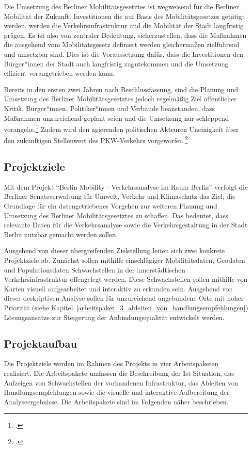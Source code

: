 Die Umsetzung des Berliner Mobilitätsgesetztes ist wegweisend für die Berliner Mobilität der Zukunft. Investitionen die auf Basis des Mobilitätsgesetzes getätigt werden, werden die Verkehrsinfrastruktur und die Mobilität der Stadt langfristig prägen. Es ist also von zentraler Bedeutung, sicherzustellen, dass die Maßnahmen die ausgehend vom Mobilitätsgesetz definiert werden gleichermaßen zielführend und umsetzbar sind. Dies ist die Voraussetzung dafür, dass die Investitionen den Bürger*innen der Stadt auch langfristig zugutekommen und die Umsetzung effizient vorangetrieben werden kann.

Bereits in den ersten zwei Jahren nach Beschlussfassung, sind die Planung und Umsetzung des Berliner Mobilitätsgesetztes jedoch regelmäßig Ziel öffentlicher Kritik. Bürger*innen, Politiker*innen und Verbände beanstanden, dass Maßnahmen unzureichend geplant seien und die Umsetzung nur schleppend vorangehe.\footcite{Tagesspiegel.2019} Zudem wird den agierenden politischen Akteuren Uneinigkeit über den zukünftigen Stellenwert des PKW-Verkehrs vorgeworfen.\footcite{Tagesspiegel.2020}

\subsection{Projektziele}
Mit dem Projekt \enquote{Berlin Mobility - Verkehrsanalyse im Raum Berlin} verfolgt die Berliner Senatsverwaltung für Umwelt, Verkehr und Klimaschutz das Ziel, die Grundlage für ein datengetriebenes Vorgehen zur weiteren Planung und Umsetzung des Berliner Mobilitätsgesetztes zu schaffen. Das bedeutet, dass relevante Daten für die Verkehrsanalyse sowie die Verkehrsgestaltung in der Stadt Berlin nutzbar gemacht werden sollen.

Ausgehend von dieser übergreifenden Zielstellung leiten sich zwei konkrete Projektziele ab. Zunächst sollen mithilfe einschlägiger Mobilitätsdaten, Geodaten und Populationsdaten Schwachstellen in der innerstädtischen Verkehrsinfrastruktur offengelegt werden. Diese Schwachstellen sollen mithilfe von Karten visuell aufgearbeitet und interaktiv zu erkunden sein. Ausgehend von dieser deskriptiven Analyse sollen für unzureichend angebundene Orte mit hoher Priorität (siehe Kapitel~\ref{arbeitspaket_3_ableiten_von_handlungsempfehlungen}) Lösungsansätze zur Steigerung der Anbindungsqualität entwickelt werden.

\subsection{Projektaufbau}
Die Projektziele werden im Rahmen des Projekts in vier Arbeitspaketen realisiert. Die Arbeitspakete umfassen die Beschreibung der Ist-Situation, das Aufzeigen von Schwachstellen der vorhandenen Infrastruktur, das Ableiten von Handlungsempfehlungen sowie die visuelle und interaktive Aufbereitung der Analyseergebnisse. Die Arbeitspakete sind im Folgenden näher beschrieben.

